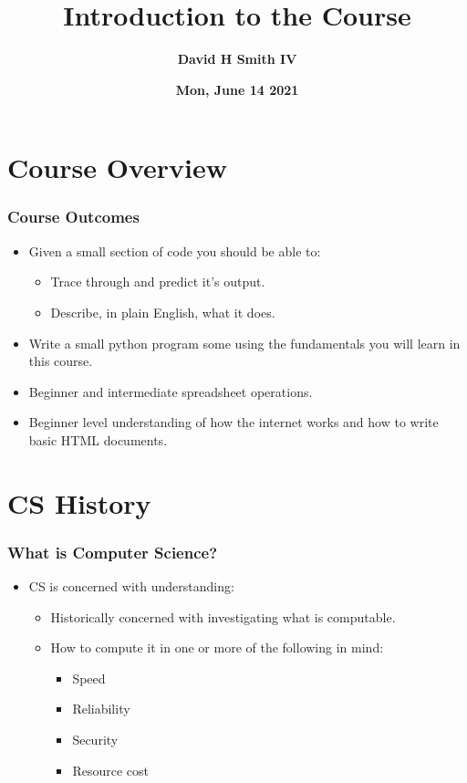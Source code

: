 \documentclass{beamer}
\title{\textbf{Introduction to the Course}}
\author{\textbf{David H Smith IV}}
\institute[\textbf{UIUC}]{\textbf{University of Illinois Urbana-Champaign}}
\date{\textbf{Mon, June 14 2021}}
\begin{document}
\frame{\titlepage}

\section{Course Overview}

%
%
\begin{frame}
  \frametitle{Course Outcomes}
  \begin{itemize}
    \item Given a small section of code you should be able to:
      \begin{itemize}
        \item Trace through and predict it's output.
        \item Describe, in plain English, what it does.
      \end{itemize}
    \item Write a small python program some using the fundamentals you will learn in this course.
    \item Beginner and intermediate spreadsheet operations.
    \item Beginner level understanding of how the internet works and how to write basic HTML documents.
  \end{itemize}
\end{frame}

\section{CS History}

%
%
\begin{frame}
  \frametitle{What is Computer Science?}
  \begin{itemize}
    \item CS is concerned with understanding:
      \begin{itemize}
      \item Historically concerned with investigating what is computable.
      \item How to compute it in one or more of the following in mind:
        \begin{itemize}
        \item Speed
        \item Reliability
        \item Security 
        \item Resource cost
      \end{itemize}
  \end{itemize}
  \end{itemize}
\end{frame}
\end{document}
